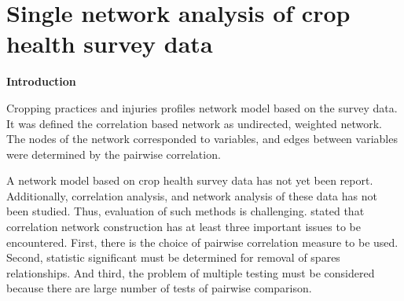 
\section*{Single network analysis of crop health survey data}
\textbf{Introduction}

Cropping practices and injuries profiles network model based on the survey data. It was defined the correlation based network as undirected, weighted network. The nodes of the network corresponded to variables, and edges between variables were determined by the pairwise correlation.

A network model based on crop health survey data has not yet been report. Additionally, correlation analysis, and network analysis of these data has not been studied. Thus, evaluation of such methods is challenging.  stated that correlation network construction has at least three important issues to be encountered. First, there is the choice of pairwise correlation measure to be used. Second, statistic significant must be determined for removal of spares relationships. And third, the problem of multiple testing must be considered because there are large number of tests of pairwise comparison.


